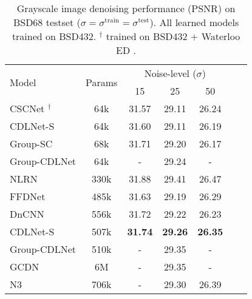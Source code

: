 \documentclass[12pt,a4paper,leqno]{amsart}
\begin{document}
\begin{table}
\centering
\caption{Grayscale image denoising performance (PSNR) on BSD68 testset ($\sigma
= \sigma^{\mathrm{train}} = \sigma^{\mathrm{test}}$). All learned models
trained on BSD432\cite{bsd}. $^\dagger$ trained on BSD432 $+$ Waterloo ED
\cite{ma2017waterloo}.}
\begin{tabular}{lcccccc} \hline
\multirow{2}{*}{Model} & \multirow{2}{*}{Params} & \multicolumn{3}{c}{Noise-level ($\sigma$)} \\
 & & 15 & 25 & 50 \\ \hline
CSCNet \cite{Simon2019}$^\dagger$ & 64k & 31.57 & 29.11 & 26.24 \\
CDLNet-S \cite{janjuvsevic2021cdlnet} & 64k & 31.60 & 29.11 & 26.19 \\
Group-SC \cite{mairal} & 68k & 31.71 & 29.20 & 26.17 \\ 
Group-CDLNet & 64k & - & 29.24 &  - \\\hline
NLRN                 & 330k& 31.88 & 29.41 & 26.47 \\
FFDNet \cite{FFDNet} & 485k& 31.63 & 29.19 & 26.29 \\
DnCNN \cite{DnCNN} & 556k& 31.72& 29.22 & 26.23 \\
CDLNet-S \cite{janjuvsevic2021cdlnet} & 507k& \bf{31.74} & \bf{29.26} & \bf{26.35} \\
Group-CDLNet & 510k & - & 29.35 &  - \\
GCDN & 6M & - & 29.35 &  - \\
N3 & 706k & - & 29.30 & 26.39 \\\hline
\end{tabular}
\end{table}
\end{document}
